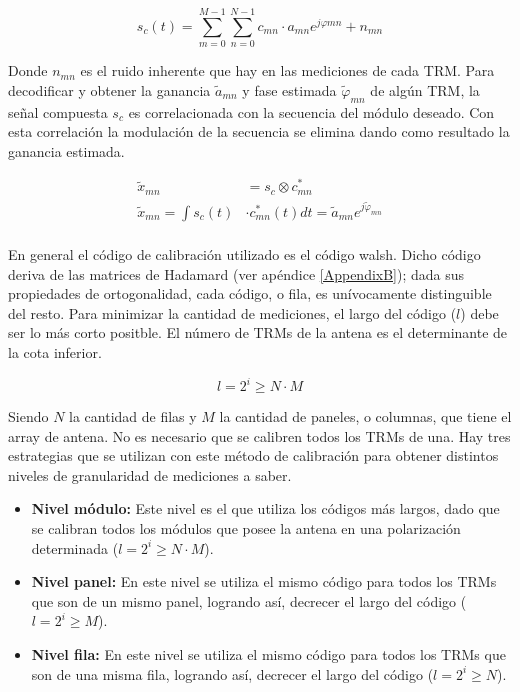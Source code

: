 \begin{equation}
	s_c(t) = \sum_{m=0}^{M-1}\sum_{n=0}^{N-1}c_{mn}\cdot a_{mn}e^{j\varphi{mn}} + n_{mn}
\end{equation}

Donde $n_{mn}$ es el ruido inherente que hay en las mediciones de cada TRM. Para decodificar y obtener la ganancia 
$\tilde{a}_{mn}$ y fase estimada $\tilde\varphi_{mn}$ de algún TRM, la señal compuesta $s_c$ es correlacionada con 
la secuencia del módulo deseado. Con esta correlación la modulación de la secuencia se elimina dando como resultado
la ganancia estimada.

\begin{equation}
\begin{aligned}
	\tilde{x}_{mn} &= s_c \otimes c^*_{mn} \\
	\tilde{x}_{mn} = \int s_c(t) &\cdot c^*_{mn}(t) dt = \tilde{a}_{mn}e^{j\tilde{\varphi}_{mn}} \\
\end{aligned}
\label{eq:classic_correlation}
\end{equation}

En general el código de calibración utilizado es el código walsh. Dicho código deriva de las matrices de Hadamard (ver 
apéndice \ref{AppendixB}); dada sus propiedades de ortogonalidad, cada código, o fila, es unívocamente distinguible del 
resto. Para minimizar la cantidad de mediciones, el largo del código ($l$) debe ser lo más corto positble. El número de 
TRMs de la antena es el determinante de la cota inferior.

\begin{equation}
	l = 2^i \ge N \cdot M
\end{equation}

Siendo $N$ la cantidad de filas y $M$ la cantidad de paneles, o columnas, que tiene el array de antena. No es necesario que 
se calibren todos los TRMs de una. Hay tres estrategias que se utilizan con este método de calibración para obtener 
distintos niveles de granularidad de mediciones a saber.

\begin{itemize}
	\item \textbf{Nivel módulo:} Este nivel es el que utiliza los códigos más largos, dado que se calibran todos los módulos que 
		posee la antena en una polarización determinada ($l = 2^i \ge N \cdot M$).
	\item \textbf{Nivel panel:} En este nivel se utiliza el mismo código para todos los TRMs que son de un mismo panel, 
		logrando así, decrecer el largo del código ($l = 2^i \ge M$).
	\item \textbf{Nivel fila:} En este nivel se utiliza el mismo código para todos los TRMs que son de una misma fila, 
		logrando así, decrecer el largo del código ($l = 2^i \ge N$).
\end{itemize}

